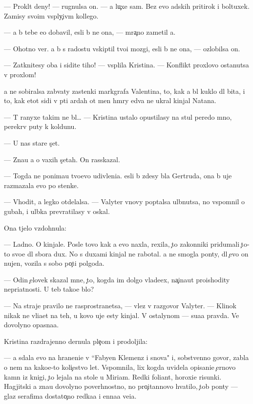 \documentclass[10pt]{book}
\begin{document}
— Prokl{\ia}t{\yi}{\y} deny! — rugnulsa on. — {\Y}a lu{\c}xe sam. Bez {\y}evo adskih pritirok i boltuxek. Za{\y}misy svo{\y}im vsp{\yi}ly{\c}iv{\yi}m kollego{\y}.

— {\Y}a b{\yi} tebe {\y}e{\x}o dobavil, {\y}esli b{\yi} ne ona, — mra{\c}no zametil {\y}a.

— Ohotno ver{\iu}. {\Y}a b{\yi} s radost{\y}u vskip{\ia}til tvo{\y}i mozgi, {\y}esli b{\yi} ne ona, — ozlobilsa on.

— Zatknitesy oba i sidite tiho! — vsp{\yi}lila Kristina. — Konflikt{\yi} proxlovo ostanutsa v proxlom!

{\Y}a ne sobiralsa zab{\yi}vaty zastenki markgrafa Valentina, to, kak {\y}a b{\yi}l kuklo{\y} dl{\ia} bit{\y}a, i to, kak etot sid{\ia}{\x}i{\y} v p{\ia}ti {\y}ardah ot men{\ia} hm{\yi}ry {\y}edva ne ukral kinjal Natana.

— T{\yi} ranyxe takim ne b{\yi}l… — Kristina ustalo opustilasy na stul peredo mno{\y}, perekr{\yi}v puty k koldunu.

— U nas star{\yi}{\y}e s{\c}et{\yi}.

— Zna{\y}u {\y}a o vaxih s{\c}etah. On rasskazal.

— Togda ne ponima{\y}u tvo{\y}evo udivleni{\y}a. {\Y}esli b{\yi} zdesy b{\yi}la Gertruda, ona b{\yi} uje razmazala {\y}evo po stenke.

— V{\yi}hodit, {\y}a legko otdelalsa. — Valyter vnovy pop{\yi}talsa ul{\yi}bnutsa, no vspomnil o gubah, i ul{\yi}bka prevratilasy v oskal.

Ona t{\ia}jelo vzdohnula:

— Ladno. O kinjale. Posle tovo kak {\y}a {\y}evo naxla, rexila, {\c}to zakonniki pridumali {\c}to-to svo{\y}e dl{\ia} sbora dux. No s duxami kinjal ne rabotal. {\Y}a ne smogla pon{\ia}ty, dl{\ia} {\c}evo on nujen, vozila s sobo{\y} po{\c}ti polgoda.

— Odin {\c}elovek skazal mne, {\c}to, kogda im dolgo vlade{\y}ex, na{\c}ina{\y}ut pro{\y}ishodity nepri{\y}atnosti. U teb{\ia} tako{\y}e b{\yi}lo?

— Na straje{\y} pravilo ne rasprostran{\ia}{\y}etsa, — vlez v razgovor Valyter. — Klinok nikak ne vli{\y}a{\y}et na teh, u kovo uje {\y}esty kinjal{\yi}. V ostalynom — su{\x}a{\y}a pravda. Ve{\x} dovolyno opasna{\y}a.

Kristina razdrajenno dernula ple{\c}om i prodoljila:

— {\Y}a sdala {\y}evo na hraneni{\y}e v ``Fabyen Klemenz i s{\yi}nov{\y}a" i, sobstvenno govor{\ia}, zab{\yi}la o nem na kako{\y}e-to koli{\c}estvo let. Vspomnila, lix kogda uvidela opisani{\y}e {\c}ernovo kamn{\ia} iz knigi, {\c}to lejala na stole u Miriam. Redki{\y} foliant, horoxi{\y}e risunki. Hagjitski{\y} {\y}a zna{\y}u dovolyno poverhnostno, no pro{\c}itannovo hvatilo, {\c}tob{\yi} pon{\ia}ty — glaz serafima dostato{\c}no redka{\y}a i {\q}enna{\y}a ve{\x}i{\q}a.
\end{document}
